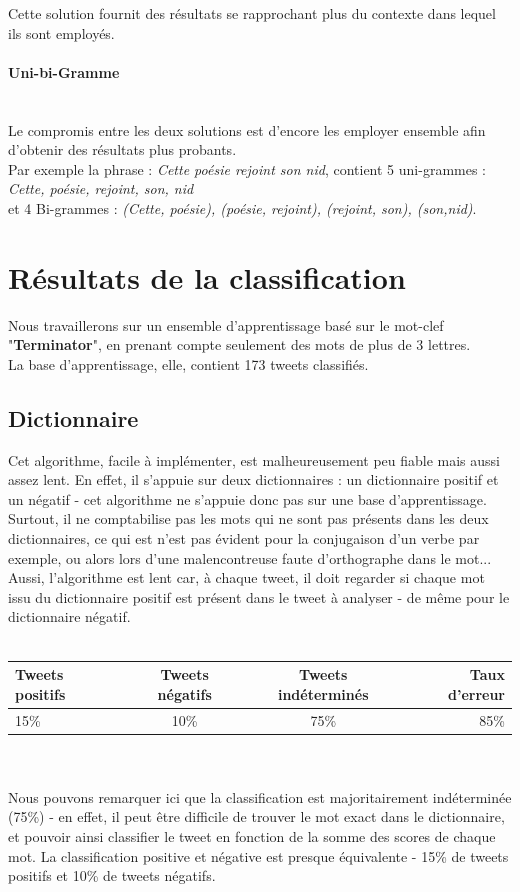 \documentclass[pdftex,12pt,a4paper]{report}
\begin{document}
\begin{spacing}{1.2}
Cette solution fournit des résultats se rapprochant plus du contexte dans lequel ils sont employés.

\subsubsection{Uni-bi-Gramme}
\\
Le compromis entre les deux solutions est d'encore les employer ensemble afin d'obtenir des résultats plus probants.
\\
Par exemple la phrase : \textit{Cette poésie rejoint son nid}, contient 5 uni-grammes : \textit{Cette, poésie, rejoint, son, nid}\\ et 4 Bi-grammes : \textit{(Cette, poésie), (poésie, rejoint), (rejoint, son), (son,nid)}.

\chapter{Résultats de la classification}

Nous travaillerons sur un ensemble d'apprentissage basé sur le mot-clef "\textbf{Terminator}", en prenant compte seulement des mots de plus de 3 lettres.
\\
La base d'apprentissage, elle, contient 173 tweets classifiés.

\section{Dictionnaire}

Cet algorithme, facile à implémenter, est malheureusement peu fiable mais aussi assez lent. En effet, il s'appuie sur deux dictionnaires : un dictionnaire positif et un négatif - cet algorithme ne s'appuie donc pas sur une base d'apprentissage. Surtout, il ne comptabilise pas les mots qui ne sont pas présents dans les deux dictionnaires, ce qui est n'est pas évident pour la conjugaison d'un verbe par exemple, ou alors lors d'une malencontreuse faute d'orthographe dans le mot...
\\
Aussi, l'algorithme est lent car, à chaque tweet, il doit regarder si chaque mot issu du dictionnaire positif est présent dans le tweet à analyser - de même pour le dictionnaire négatif.
\\
\\
\begin{tabular}{|l|c|c|r|}
  \hline
  \textbf{Tweets positifs} & \textbf{Tweets négatifs} & \textbf{Tweets indéterminés} & \textbf{Taux d'erreur}\\
  \hline
  15\% & 10\% & 75\% & 85\%\\
  \hline
\end{tabular}
\\
\\
Nous pouvons remarquer ici que la classification est majoritairement indéterminée (75\%) - en effet, il peut être difficile de trouver le mot exact dans le dictionnaire, et pouvoir ainsi classifier le tweet en fonction de la somme des scores de chaque mot. La classification positive et négative est presque équivalente - 15\% de tweets positifs et 10\% de tweets négatifs.


\end{spacing}
\end{document}
